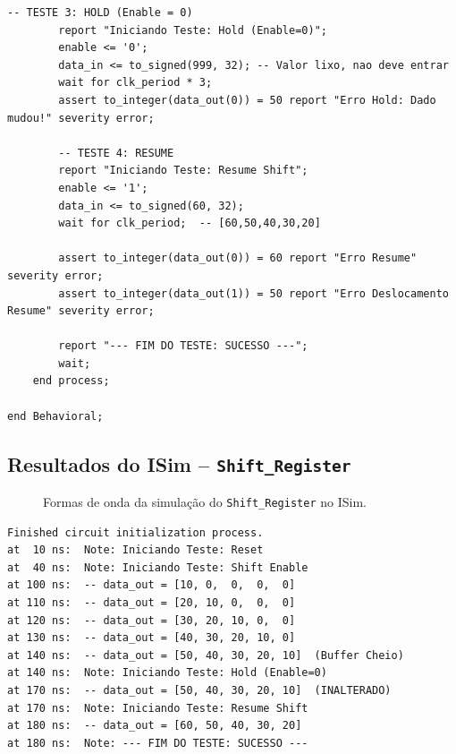 \documentclass[a4paper,12pt]{article}
\begin{document}
\begin{lstlisting}[style=vhdlstyle,
    caption={Testbench do \texttt{Shift\_Register} (DEPTH = 4, buffer de 5 posi\c{c}\~oes).},
    label={lst:sr_tb}]
        -- TESTE 3: HOLD (Enable = 0)
        report "Iniciando Teste: Hold (Enable=0)";
        enable <= '0';
        data_in <= to_signed(999, 32); -- Valor lixo, nao deve entrar
        wait for clk_period * 3;
        assert to_integer(data_out(0)) = 50 report "Erro Hold: Dado mudou!" severity error;

        -- TESTE 4: RESUME
        report "Iniciando Teste: Resume Shift";
        enable <= '1';
        data_in <= to_signed(60, 32);
        wait for clk_period;  -- [60,50,40,30,20]

        assert to_integer(data_out(0)) = 60 report "Erro Resume" severity error;
        assert to_integer(data_out(1)) = 50 report "Erro Deslocamento Resume" severity error;

        report "--- FIM DO TESTE: SUCESSO ---";
        wait;
    end process;

end Behavioral;
\end{lstlisting}

\subsection{Resultados do ISim -- \texttt{Shift\_Register}}

\begin{figure}[H]
\centering
{}
\caption{Formas de onda da simula\c{c}\~ao do \texttt{Shift\_Register} no ISim.}
\label{fig:wave_sr}
\end{figure}

\begin{lstlisting}[style=logstyle,
    caption={Log de sa\'ida do ISim -- \texttt{Shift\_Register}.},
    label={lst:log_sr}]
Finished circuit initialization process.
at  10 ns:  Note: Iniciando Teste: Reset
at  40 ns:  Note: Iniciando Teste: Shift Enable
at 100 ns:  -- data_out = [10, 0,  0,  0,  0]
at 110 ns:  -- data_out = [20, 10, 0,  0,  0]
at 120 ns:  -- data_out = [30, 20, 10, 0,  0]
at 130 ns:  -- data_out = [40, 30, 20, 10, 0]
at 140 ns:  -- data_out = [50, 40, 30, 20, 10]  (Buffer Cheio)
at 140 ns:  Note: Iniciando Teste: Hold (Enable=0)
at 170 ns:  -- data_out = [50, 40, 30, 20, 10]  (INALTERADO)
at 170 ns:  Note: Iniciando Teste: Resume Shift
at 180 ns:  -- data_out = [60, 50, 40, 30, 20]
at 180 ns:  Note: --- FIM DO TESTE: SUCESSO ---
\end{lstlisting}
\end{document}
